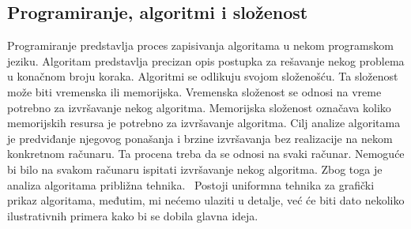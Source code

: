\documentclass[a4paper]{article}
\begin{document}
\subsection{Programiranje, algoritmi i složenost}
Programiranje predstavlja proces zapisivanja algoritama u nekom programskom jeziku.
Algoritam predstavlja precizan opis postupka za rešavanje nekog problema u konačnom broju koraka. Algoritmi se odlikuju svojom složenošću. Ta složenost može biti vremenska ili memorijska. Vremenska složenost se odnosi na vreme potrebno za izvršavanje nekog algoritma. Memorijska složenost označava koliko memorijskih resursa je potrebno za izvršavanje algoritma. Cilj analize algoritama je predviđanje njegovog ponašanja i brzine izvršavanja bez realizacije na nekom konkretnom računaru. Ta procena treba da se odnosi na svaki računar. Nemoguće bi bilo na svakom računaru ispitati izvršavanje nekog algoritma. Zbog toga je analiza algoritama približna tehnika.~\cite{Zivkovic} Postoji uniformna tehnika za grafički prikaz algoritama, međutim, mi nećemo ulaziti u detalje, već će biti dato nekoliko ilustrativnih primera kako bi se dobila glavna ideja.
\end{document}
